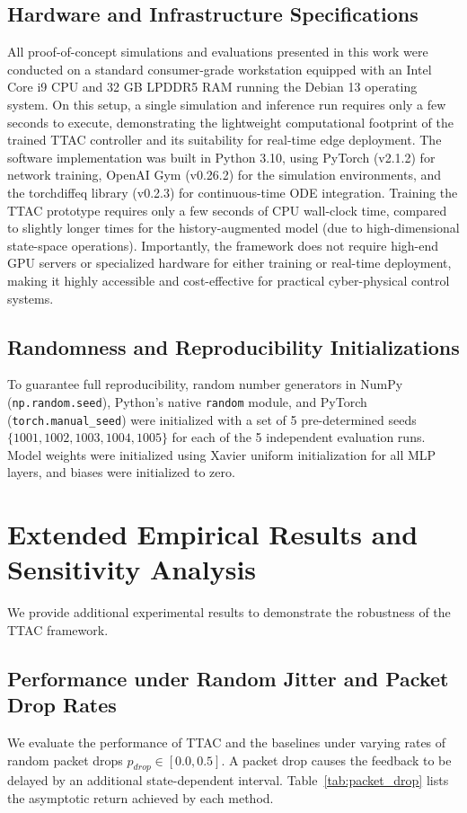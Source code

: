 \documentclass[manuscript, screen, review]{jair}
\begin{document}
\subsection{Hardware and Infrastructure Specifications}\label{app:sub_hardware}
All proof-of-concept simulations and evaluations presented in this work were conducted on a standard consumer-grade workstation equipped with an Intel Core i9 CPU and 32 GB LPDDR5 RAM running the Debian 13 operating system. On this setup, a single simulation and inference run requires only a few seconds to execute, demonstrating the lightweight computational footprint of the trained TTAC controller and its suitability for real-time edge deployment. The software implementation was built in Python 3.10, using PyTorch (v2.1.2) for network training, OpenAI Gym (v0.26.2) for the simulation environments, and the torchdiffeq library (v0.2.3) for continuous-time ODE integration. Training the TTAC prototype requires only a few seconds of CPU wall-clock time, compared to slightly longer times for the history-augmented model (due to high-dimensional state-space operations). Importantly, the framework does not require high-end GPU servers or specialized hardware for either training or real-time deployment, making it highly accessible and cost-effective for practical cyber-physical control systems.

\subsection{Randomness and Reproducibility Initializations}\label{app:sub_randomness}
To guarantee full reproducibility, random number generators in NumPy (\texttt{np.random.seed}), Python's native \texttt{random} module, and PyTorch (\texttt{torch.manual\_seed}) were initialized with a set of 5 pre-determined seeds $\{1001, 1002, 1003, 1004, 1005\}$ for each of the 5 independent evaluation runs. Model weights were initialized using Xavier uniform initialization for all MLP layers, and biases were initialized to zero.

\section{Extended Empirical Results and Sensitivity Analysis}\label{app:sec_results}
We provide additional experimental results to demonstrate the robustness of the TTAC framework.

\subsection{Performance under Random Jitter and Packet Drop Rates}\label{app:sub_packet_drop}
We evaluate the performance of TTAC and the baselines under varying rates of random packet drops $p_{drop} \in [0.0, 0.5]$. A packet drop causes the feedback to be delayed by an additional state-dependent interval. Table~\ref{tab:packet_drop} lists the asymptotic return achieved by each method.
\end{document}
